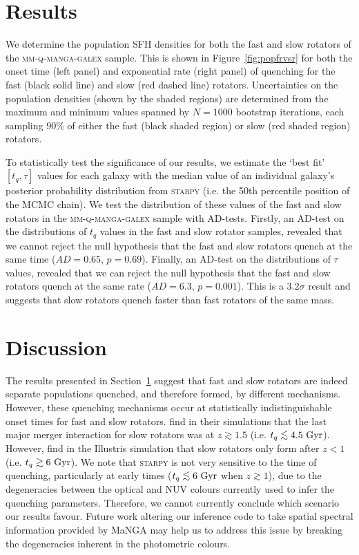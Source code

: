 \documentclass[useAMS,usenatbib]{mn2e}
\def\lesssim{\mathrel{\hbox{\rlap{\hbox{\lower3pt\hbox{$\sim$}}}\hbox{\raise2pt\hbox{$<$}}}}}
\begin{document}
\section{Results}\label{sec:results}

We determine the population SFH densities for both the fast and slow rotators of the \textsc{mm-q-manga-galex} sample. This is shown in Figure~\ref{fig:popfrvsr} for both the onset time (left panel) and exponential rate (right panel) of quenching for the fast (black solid line) and slow (red dashed line) rotators. Uncertainties on the population densities (shown by the shaded regions) are determined from the maximum and minimum values spanned by $N = 1000$ bootstrap iterations, each sampling $90\%$ of either the fast (black shaded region) or slow (red shaded region) rotators. 

To statistically test the significance of our results, we estimate the `best fit' $[t_q, \tau]$ values for each galaxy with the median value of an individual galaxy's posterior probability distribution from \textsc{starpy} (i.e. the 50th percentile position of the MCMC chain). We test the distribution of these values of the fast and slow rotators in the \textsc{mm-q-manga-galex} sample with AD-tests. Firstly, an AD-test on the distributions of $t_q$ values in the fast and slow rotator samples, revealed that we cannot reject the null hypothesis that the fast and slow rotators quench at the same time ($AD= 0.65$, $p = 0.69$). Finally, an AD-test on the distributions of $\tau$ values, revealed that we can reject the null hypothesis that the fast and slow rotators quench at the same rate ($AD= 6.3$, $p = 0.001$). This is a $3.2\sigma$ result and suggests that slow rotators quench faster than fast rotators of the same mass.


\section{Discussion}\label{sec:discussion}

The results presented in Section~\ref{sec:results} suggest that fast and slow rotators are indeed separate populations quenched, and therefore formed, by different mechanisms. However, these quenching mechanisms occur at statistically indistinguishable onset times for fast and slow rotators. \cite{khochfar11} find in their simulations that the last major merger interaction for slow rotators was at $z \gtrsim 1.5$ (i.e. $t_q \lesssim 4.5~\rm{Gyr}$). However, \cite{penoyre17}  find in the Illustris simulation that slow rotators only form after $z < 1$ (i.e. $t_q \gtrsim 6~\rm{Gyr}$). We note that \textsc{starpy} is not very sensitive to the time of quenching, particularly at early times ($t_q \lesssim 6~\rm{Gyr}$ when $z \gtrsim 1$), due to the degeneracies between the optical and NUV colours currently used to infer the quenching parameters. Therefore, we cannot currently conclude which scenario our results favour. Future work altering our inference code to take spatial spectral information provided by MaNGA may help us to address this issue by breaking the degeneracies inherent in the photometric colours.
\end{document}
